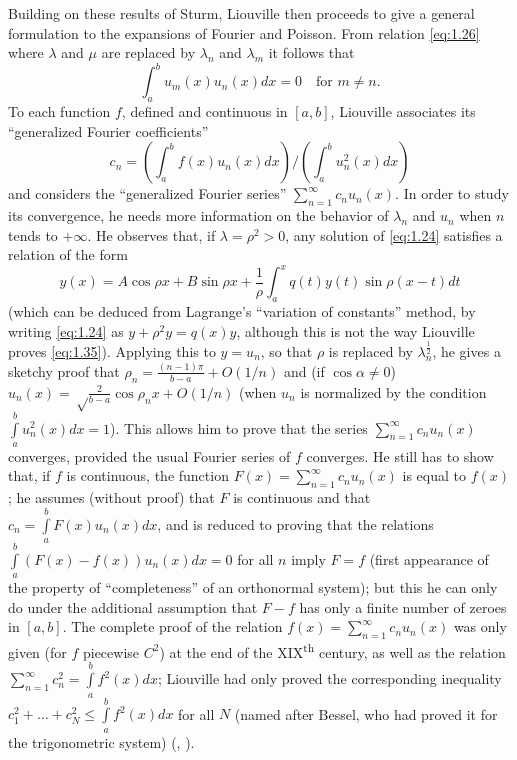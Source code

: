 \documentclass[12pt,a4paper,leqno,twoside]{extbook}
\newcommand{\supth}{\texorpdfstring{\textsuperscript{th}}{th}}
\begin{document}
Building on these results of Sturm, Liouville then proceeds to give a general formulation to the expansions of Fourier and Poisson. From relation \eqref{eq:1.26} where \(\lambda\) and \(\mu\) are replaced by \(\lambda_n\) and \(\lambda_m\) it follows that
\begin{equation}
    \label{eq:1.33}
    \int_a^b u_m(x)u_n(x)dx = 0 \quad \text{for \(m \neq n\)}.
\end{equation}
To each function \(f\), defined and continuous in \([a,b]\), Liouville associates its ``generalized Fourier coefficients''
\begin{equation}
    \label{eq:1.34}
    c_n = \left(\int_a^b f(x)u_n(x) dx\right) \Bigg/ \left(\int_a^b u_n^2(x)dx\right)
\end{equation}
and considers the ``generalized Fourier series'' \(\sum\limits_{n=1}^\infty c_n u_n(x)\). In order to study its convergence, he needs more information on the behavior of \(\lambda_n\) and \(u_n\) when \(n\) tends to \(+\infty\). He observes that, if \(\lambda = \rho^2 > 0\), any solution of \eqref{eq:1.24} satisfies a relation of the form
\begin{equation}
    \label{eq:1.35}
    y(x) = A \cos{\rho x} + B \sin{\rho x} + \frac{1}{\rho} \int_a^x q(t)y(t)\sin{\rho(x-t)}dt
\end{equation}
(which can be deduced from Lagrange's ``variation of constants'' method, by writing \eqref{eq:1.24} as \(y + \rho^2 y = q(x)y\), although this is not the way Liouville proves \eqref{eq:1.35}). Applying this to \(y = u_n\), so that \(\rho\) is replaced by \(\lambda_n^\frac{1}{2}\), he gives a sketchy proof that \(\rho_n = \frac{(n-1)\pi}{b-a} + O(1/n)\) and (if \(\cos\alpha \neq 0\)) \(u_n(x) = \sqrt\frac{2}{b-a} \cos{\rho_n x} + O(1/n)\) (when \(u_n\) is normalized by the condition \(\int\limits_a^b u_n^2(x)dx = 1\)). This allows him to prove that the series \(\sum\limits_{n=1}^\infty c_n u_n(x)\) converges, provided the usual Fourier series of \(f\) converges. He still has to show that, if \(f\) is continuous, the function \(F(x) = \sum\limits_{n=1}^\infty c_n u_n(x)\) is equal to \(f(x)\); he assumes (without proof) that \(F\) is continuous and that \(c_n = \int\limits_a^b F(x)u_n(x)dx\), and is reduced to proving that the relations \(\int\limits_a^b (F(x)-f(x))u_n(x)dx = 0\) for all \(n\) imply \(F = f\) (first appearance of the property of ``completeness'' of an orthonormal system); but this he can only do under the additional assumption that \(F-f\) has only a finite number of zeroes in \([a,b]\). The complete proof of the relation \(f(x) = \sum\limits_{n=1}^\infty c_n u_n(x)\) was only given (for \(f\) piecewise \(C^2\)) at the end of the XIX\supth{} century, as well as the relation \(\sum\limits_{n=1}^\infty c_n^2 = \int\limits_a^b f^2(x)dx\); Liouville had only proved the corresponding inequality \(c_1^2 + \ldots  + c_N^2 \leq \int\limits_a^b f^2(x)dx\) for all \(N\) (named after Bessel, who had proved it for the trigonometric system) (\cite{151}, \cite[p.~268--281]{S}).
\end{document}
